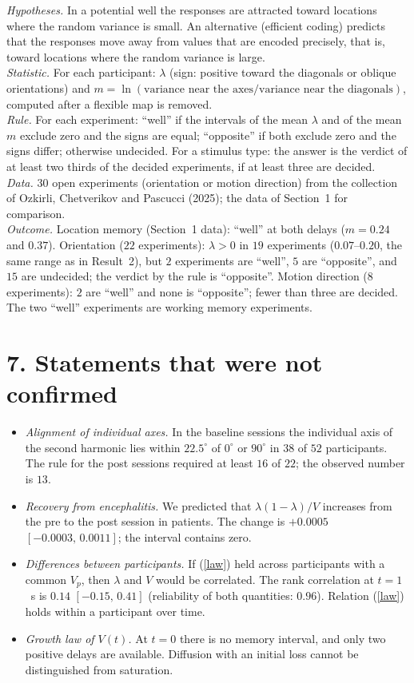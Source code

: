 \documentclass[10pt,a4paper]{article}
\newcommand{\dg}{^{\circ}}
\newcommand{\ci}[2]{$[#1,\,#2]$}
\newcommand{\hyp}{\emph{Hypotheses.} }
\newcommand{\stat}{\emph{Statistic.} }
\newcommand{\rul}{\emph{Rule.} }
\newcommand{\dat}{\emph{Data.} }
\newcommand{\outc}{\emph{Outcome.} }
\begin{document}
\hyp In a potential well the responses are attracted toward locations where the random variance is small. An
alternative (efficient coding) predicts that the responses move away from values that are encoded
precisely, that is, toward locations where the random variance is large.\\
\stat For each participant: $\lambda$ (sign: positive toward the diagonals or oblique orientations) and
$m=\ln(\text{variance near the axes}/\text{variance near the diagonals})$, computed after a flexible map is
removed.\\
\rul For each experiment: ``well'' if the intervals of the mean $\lambda$ and of the mean $m$ exclude zero and
the signs are equal; ``opposite'' if both exclude zero and the signs differ; otherwise undecided. For a
stimulus type: the answer is the verdict of at least two thirds of the decided experiments, if at least
three are decided.\\
\dat $30$ open experiments (orientation or motion direction) from the collection of Ozkirli, Chetverikov and
Pascucci (2025); the data of Section~1 for comparison.\\
\outc Location memory (Section~1 data): ``well'' at both delays ($m=0.24$ and $0.37$). Orientation ($22$
experiments): $\lambda>0$ in $19$ experiments ($0.07$--$0.20$, the same range as in Result~2), but $2$
experiments are ``well'', $5$ are ``opposite'', and $15$ are undecided; the verdict by the rule is
``opposite''. Motion direction ($8$ experiments): $2$ are ``well'' and none is ``opposite''; fewer than
three are decided. The two ``well'' experiments are working memory experiments.

\section*{7. Statements that were not confirmed}

\begin{itemize}
\item \emph{Alignment of individual axes.} In the baseline sessions the individual axis of the second harmonic
lies within $22.5\dg$ of $0\dg$ or $90\dg$ in $38$ of $52$ participants. The rule for the post sessions
required at least $16$ of $22$; the observed number is $13$.
\item \emph{Recovery from encephalitis.} We predicted that $\lambda(1-\lambda)/V$ increases from the pre to
the post session in patients. The change is $+0.0005$ \ci{-0.0003}{0.0011}; the interval contains zero.
\item \emph{Differences between participants.} If (\ref{law}) held across participants with a common $V_p$,
then $\lambda$ and $V$ would be correlated. The rank correlation at $t=1$~s is $0.14$ \ci{-0.15}{0.41}
(reliability of both quantities: $0.96$). Relation (\ref{law}) holds within a participant over time.
\item \emph{Growth law of $V(t)$.} At $t=0$ there is no memory interval, and only two positive delays are
available. Diffusion with an initial loss cannot be distinguished from saturation.
\end{itemize}
\end{document}
